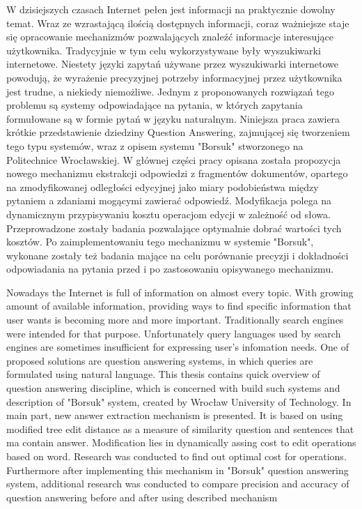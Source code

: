 \documentclass[a4paper, twoside, 12pt]{report}
\newenvironment{abstractpage}
  {\vspace*{\fill}\thispagestyle{empty}}
    {\vfill}
\renewenvironment{abstract}[1]
      {\bigskip\selectlanguage{#1}%
             \begin{center}\bfseries\abstractname\end{center}}
           {\par\bigskip}
\begin{document}
% 


\begin{abstractpage}
\begin{abstract}{polish}
    W dzisiejszych czasach Internet pełen jest informacji na praktycznie dowolny temat. Wraz ze wzrastającą ilością
    dostępnych informacji, coraz ważniejsze staje się opracowanie mechanizmów pozwalających znaleźć informacje
    interesujące użytkownika. Tradycyjnie w tym celu wykorzystywane były wyszukiwarki internetowe. Niestety
    języki zapytań używane przez wyszukiwarki internetowe powodują, że wyrażenie precyzyjnej potrzeby informacyjnej
    przez użytkownika jest trudne, a niekiedy niemożliwe. Jednym z proponowanych rozwiązań tego problemu są systemy
    odpowiadające na pytania, w których zapytania formułowane są w formie pytań w języku naturalnym. Niniejsza
    praca zawiera krótkie przedstawienie dziedziny Question Answering, zajmującej się tworzeniem tego typu systemów,
    wraz z opisem systemu "Borsuk" stworzonego na Politechnice Wrocławskiej.
    W głównej części pracy opisana została propozycja nowego mechanizmu ekstrakcji odpowiedzi z fragmentów dokumentów,
    opartego na zmodyfikowanej odległości edycyjnej jako miary podobieństwa między pytaniem a zdaniami mogącymi zawierać
    odpowiedź. Modyfikacja polega na dynamicznym przypisywaniu kosztu operacjom edycji w zależność od słowa. Przeprowadzone
    zostały badania pozwalające optymalnie dobrać wartości tych kosztów. Po zaimplementowaniu tego mechanizmu w systemie "Borsuk",
    wykonane zostały też badania mające na celu porównanie precyzji i dokładności odpowiadania na pytania przed i po
    zastosowaniu opisywanego mechanizmu.
\end{abstract}

\begin{abstract}{english}
    Nowadays the Internet is full of information on almost every topic. With growing amount of available information,
    providing ways to find specific information that user wants is becoming more and more important. Traditionally
    search engines were intended for that purpose. Unfortunately query languages used by search engines are sometimes
    insufficient for expressing user's infomation needs. One of proposed solutions are question answering systems, in which
    queries are formulated using natural language. This thesis contains quick overview of question answering discipline,
    which is concerned with build such systems and description of "Borsuk" system, created by Wrocław University of Technology.
    In main part, new answer extraction mechanism is presented. It is based on using modified tree edit distance as a measure of
    similarity question and sentences that ma contain answer. Modification lies in dynamically assing cost to edit operations
    based on word. Research was conducted to find out optimal cost for operations. Furthermore after implementing this
    mechanism in "Borsuk" question answering system, additional research was conducted to compare precision and accuracy
    of question answering before and after using described mechanism
\end{abstract}
\end{abstractpage}
\end{document}
